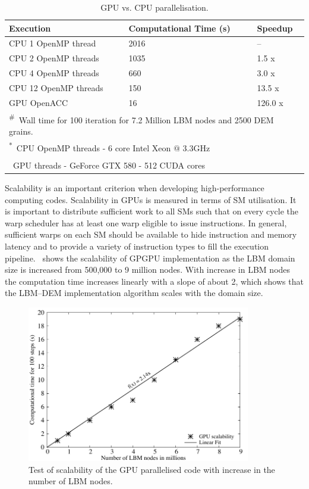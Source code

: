 \begin{table}[tbhp]
	\caption{GPU vs. CPU parallelisation.}
	\label{table:GPU}
	\centering
	\begin{tabular}{l l l}
		\toprule
		Execution & Computational Time (s) &  Speedup \\
		\midrule
		CPU 1 OpenMP thread		& 2016	 & -- \\
		CPU 2 OpenMP threads	& 1035	 & 1.5 x \\
		CPU 4 OpenMP threads	& 660 	 & 3.0 x \\
		CPU 12 OpenMP threads	& 150	 & 13.5 x\\
		GPU OpenACC				& 16	 & 126.0 x \\
		\bottomrule
		\multicolumn{3}{l}{\footnotesize{\textsuperscript{\#}}~Wall time 
		for 100 iteration for 7.2 Million LBM nodes and 2500 DEM grains.} \\
		\multicolumn{3}{l}{\footnotesize{\textsuperscript{*}~CPU OpenMP threads 
		- 6 core Intel Xeon $\mathrm{@}$ 3.3GHz}} \\
		\multicolumn{3}{l}{\footnotesize{\textsuperscript{\dag}~GPU threads - 
		GeForce GTX 580 - 512 CUDA cores}}
	\end{tabular}
\end{table}

Scalability is an important criterion when developing high-performance 
computing codes. Scalability in GPUs is measured in terms of SM utilisation. It 
is important to distribute sufficient work to all SMs such that on every cycle 
the warp scheduler has at least one warp eligible to issue instructions. In 
general, sufficient warps on each SM should be available to hide instruction 
and memory latency and to provide a variety of instruction types to 
fill the execution pipeline.~ shows the scalability of 
GPGPU implementation as the LBM domain size is increased from 500,000 to 9 
million nodes. With increase in LBM nodes the computation time increases 
linearly with a slope of about 2, which shows that the LBM--DEM implementation 
algorithm scales with the domain size.

\begin{figure}[tbhp]
	\centering
	\includegraphics[width=0.87\textwidth]{GPU_Speedup}
	\caption{Test of scalability of the GPU parallelised code with increase in 
	the number of LBM nodes.}
	\label{fig:GPUSpeed}
\end{figure}

